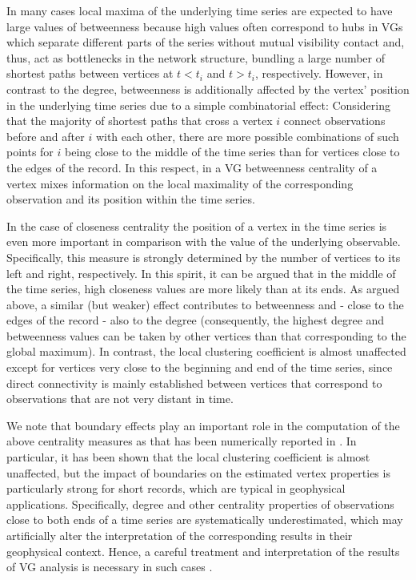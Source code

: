 		In many cases local maxima of the underlying time series are expected to have large values of betweenness because high values often correspond to hubs in VGs which separate different parts of the series without mutual visibility contact and, thus, act as bottlenecks in the network structure, bundling a large number of shortest paths between vertices at $t < t_i$ and $t > t_i$, respectively. However, in contrast to the degree, betweenness is additionally affected by the vertex' position in the underlying time series due to a simple combinatorial effect: Considering that the majority of shortest paths that cross a vertex $i$ connect observations before and after $i$ with each other, there are more possible combinations of such points for $i$ being close to the middle of the time series than for vertices close to the edges of the record. In this respect, in a VG betweenness centrality of a vertex mixes information on the local maximality of the corresponding observation and its position within the time series.
		
		In the case of closeness centrality the position of a vertex in the time series is even more important in comparison with the value of the underlying observable. Specifically, this measure is strongly determined by the number of vertices to its left and right, respectively. In this spirit, it can be argued that in the middle of the time series, high closeness values are more likely than at its ends. As argued above, a similar (but weaker) effect contributes to betweenness and - close to the edges of the record - also to the degree (consequently, the highest degree and betweenness values can be taken by other vertices than that corresponding to the global maximum). In contrast, the local clustering coefficient is almost unaffected except for vertices very close to the beginning and end of the time series, since direct connectivity is mainly established between vertices that correspond to observations that are not very distant in time. 
		
		We note that boundary effects play an important role in the computation of the above centrality measures as that has been numerically reported in \cite{Donner2012}. In particular, it has been shown that the local clustering coefficient is almost unaffected, but the impact of boundaries on the estimated vertex properties is particularly strong for short records, which are typical in geophysical applications. Specifically, degree and other centrality properties of observations close to both ends of a time series are systematically underestimated, which may artificially alter the interpretation of the corresponding results in their geophysical context. Hence, a careful treatment and interpretation of the results of VG analysis is necessary in such cases \cite{Donner2012}.
	
